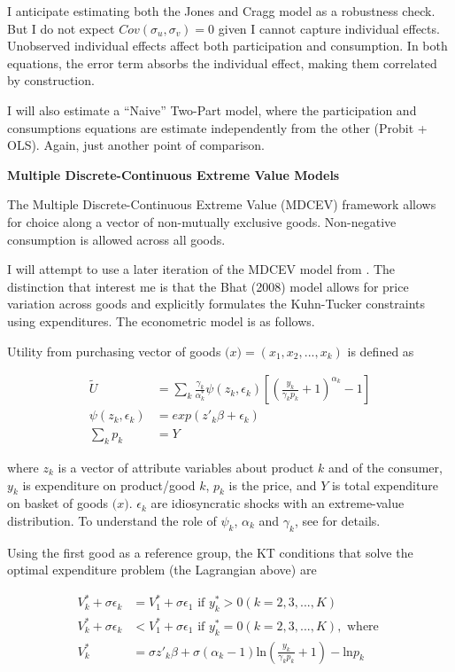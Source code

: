 \documentclass[12pt,letterpaperpaper,]{book}
\begin{document}
I anticipate estimating both the Jones and Cragg model as a robustness
check. But I do not expect \(Cov(\sigma_u, \sigma_v) = 0\) given I
cannot capture individual effects. Unobserved individual effects affect
both participation and consumption. In both equations, the error term
absorbs the individual effect, making them correlated by construction.

I will also estimate a ``Naive'' Two-Part model, where the participation
and consumptions equations are estimate independently from the other
(Probit + OLS). Again, just another point of comparison.

\textbf{Multiple Discrete-Continuous Extreme Value Models}

The \citet{bhat_multiple_2005} Multiple Discrete-Continuous Extreme
Value (MDCEV) framework allows for choice along a vector of non-mutually
exclusive goods. Non-negative consumption is allowed across all goods.

I will attempt to use a later iteration of the MDCEV model from
\citet{bhat_multiple_2008}. The distinction that interest me is that the
Bhat (2008) model allows for price variation across goods and explicitly
formulates the Kuhn-Tucker constraints using expenditures. The
econometric model is as follows.

Utility from purchasing vector of goods \(\bm(x) = (x_1, x_2,...,x_k)\)
is defined as

\[
\begin{aligned}
\tilde{U} &= \sum_k \frac{\gamma_k}{\alpha^*_k} \psi(z_k, \epsilon_k)
  \left [
    \left (
      \frac{y_k}{\gamma_k p_k} + 1
    \right )^{\alpha_k} - 1
  \right ] \\
\psi(z_k, \epsilon_k) &= exp(z'_k\beta + \epsilon_k)
\\
\sum_k p_k &= Y
\end{aligned}
\]

where \(z_k\) is a vector of attribute variables about product \(k\) and
of the consumer, \(y_k\) is expenditure on product/good \(k\), \(p_k\)
is the price, and \(Y\) is total expenditure on basket of goods
\(\bm(x)\). \(\epsilon_k\) are idiosyncratic shocks with an
extreme-value distribution. To understand the role of \(\psi_k\),
\(\alpha_k\) and \(\gamma_k\), see \citet{bhat_multiple_2008} for
details.

Using the first good as a reference group, the KT conditions that solve
the optimal expenditure problem (the Lagrangian above) are

\[
\begin{aligned}
V_k^* + \sigma \epsilon_k &= V_1^* + \sigma \epsilon_1 \text{ if }
  y_k^* > 0 (k = 2,3,...,K) \\
V_k^* + \sigma \epsilon_k &< V_1^* + \sigma \epsilon_1 \text{ if }
  y_k^* = 0 (k = 2,3,...,K), \text{ where } \\
V_k^* &= \sigma z'_k \beta + \sigma (\alpha_k - 1)
  \text{ln} \left ( \frac{y_k}{\gamma_k p_k} + 1 \right ) - \text{ln} p_k
\end{aligned}
\]
\end{document}
